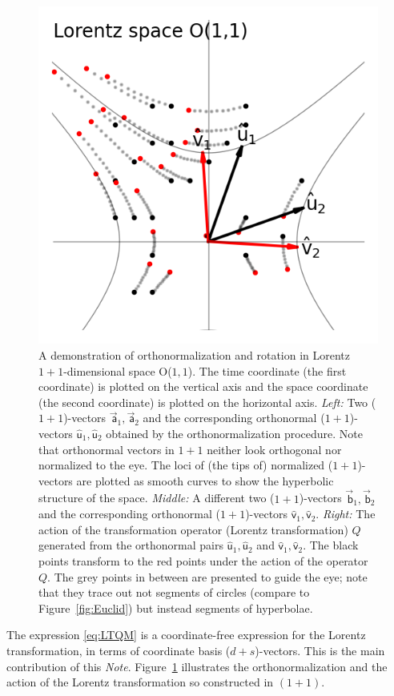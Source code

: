 \documentclass{article}
\newcommand\upvec[1]{\!\vec{\,\mathrm{#1}}}
\newcommand{\Lvec}[1]{\upvec{\mathsf{#1}}} %
\newcommand{\Lhat}[1]{\hat{\mathsf{#1}}} %
\newcommand{\plus}{\!+\!} %
\newcommand{\documentname}{\textsl{Note}}
\newcommand{\figref}[1]{Figure~\ref{#1}}
\newlength{\figurewidth}
\begin{document}
\begin{figure}[t]
\begin{mdframed}
\includegraphics[width=\figurewidth]{L_Q.png}
\caption{A demonstration of orthonormalization and rotation in Lorentz $1\plus 1$-dimensional space O($1,1$).
The time coordinate (the first coordinate) is plotted on the vertical axis and the space coordinate (the second coordinate) is plotted on the horizontal axis.
\textsl{Left:} Two ($1\plus1$)-vectors $\Lvec{a}_1, \Lvec{a}_2$ and the corresponding orthonormal ($1\plus1$)-vectors $\Lhat{u}_1, \Lhat{u}_2$ obtained by the orthonormalization procedure.
Note that orthonormal vectors in $1\plus1$ neither look orthogonal nor normalized to the eye.
The loci of (the tips of) normalized ($1\plus1$)-vectors are plotted as smooth curves to show the hyperbolic structure of the space.
\textsl{Middle:} A different two ($1\plus1$)-vectors $\Lvec{b}_1, \Lvec{b}_2$ and the corresponding orthonormal ($1\plus1$)-vectors $\Lhat{v}_1, \Lhat{v}_2$.
\textsl{Right:} The action of the transformation operator (Lorentz transformation) $Q$ generated from the orthonormal pairs $\Lhat{u}_1, \Lhat{u}_2$ and $\Lhat{v}_1, \Lhat{v}_2$.
The black points transform to the red points under the action of the operator $Q$.
The grey points in between are presented to guide the eye; 
note that they trace out not segments of circles (compare to \figref{fig:Euclid}) but instead segments of hyperbolae.\label{fig:Lorentz}}
\end{mdframed}
\end{figure}
The expression \eqref{eq:LTQM} is a coordinate-free expression for the Lorentz transformation, in terms of coordinate basis ($d\plus s$)-vectors.
This is the main contribution of this \documentname.
\figref{fig:Lorentz} illustrates the orthonormalization and the action of the Lorentz transformation so constructed in $(1\plus1)$.
\end{document}
